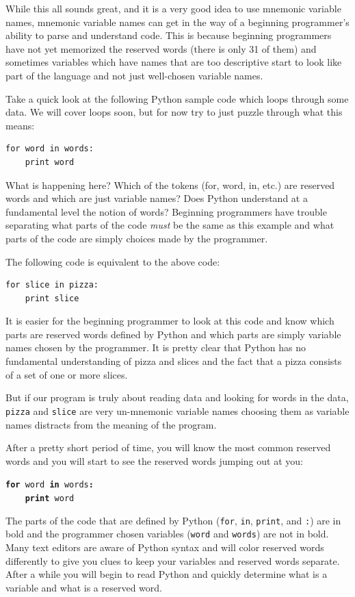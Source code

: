 \documentclass[10pt]{book}
\begin{document}
While this all sounds great, and it is a very good idea to use mnemonic variable
names, mnemonic variable names can get in the way of a beginning programmer's 
ability to parse and understand code.  This is because beginning programmers 
have not yet memorized the reserved words (there is only 31 of them) and sometimes
variables which have names that are too descriptive start to look like 
part of the language and not just well-chosen variable names.

Take a quick look at the following Python sample code which loops through some data. 
We will cover loops soon, but for now try to just puzzle through what this means:

\beforeverb
\begin{verbatim}
for word in words:
    print word
\end{verbatim}
\afterverb
%
What is happening here?  Which of the tokens (for, word, in, etc.) are reserved words
and which are just variable names?  Does Python understand at a fundamental level 
the notion of words?  Beginning programmers have 
trouble separating what parts of the
code {\em must} be the same as this example and what parts of the code are simply
choices made by the programmer.

The following code is equivalent to the above code:

\beforeverb
\begin{verbatim}
for slice in pizza:
    print slice
\end{verbatim}
\afterverb
%
It is easier for the beginning programmer to look at this code and know which 
parts are reserved words defined by Python and which parts are simply variable
names chosen by the programmer.  It is pretty clear that Python has no fundamental
understanding of pizza and slices and the fact that a pizza consists of a set
of one or more slices.

But if our program is truly about reading data and looking for words in the data,
{\tt pizza} and {\tt slice} are very un-mnemonic variable names choosing them 
as variable names distracts from the meaning of the program.

After a pretty short period of time, you will know the most common reserved words
and you will start to see the reserved words jumping out at you:

{\tt {\bf for} word {\bf in} words{\bf :}\\
\verb"    "{\bf print} word }

The parts of the code that are defined by 
Python ({\tt for}, {\tt in}, {\tt print}, and {\tt :}) are in bold
and the programmer chosen variables ({\tt word} and {\tt words}) are not in bold.  
Many text editors are aware of Python
syntax and will color reserved words differently to give you clues to keep 
your variables and reserved words separate.
After a while you will begin to read Python and quickly determine what
is a variable and what is a reserved word.
\end{document}
